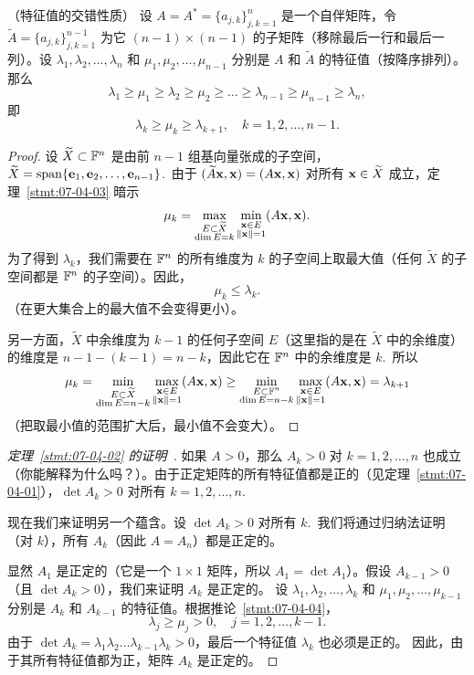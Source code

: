 \begin{corollary}\label{stmt:07-04-04}
（特征值的交错性质）
设 $A = A^* = \{a_{j,k}\}^{n}_{j,k=1}$ 是一个自伴矩阵，令 $\widetilde{A} = \{a_{j,k}\}^{n-1}_{j,k=1}$ 为它 $(n-1) \times (n-1)$ 的子矩阵（移除最后一行和最后一列）。设 $\lambda_1, \lambda_2, \dots, \lambda_n$ 和 $\mu_1, \mu_2, \dots, \mu_{n-1}$ 分别是 $A$ 和 $\widetilde{A}$ 的特征值（按降序排列）。那么
$$\lambda_1 \ge \mu_1 \ge \lambda_2 \ge \mu_2 \ge \dots \ge \lambda_{n-1} \ge \mu_{n-1} \ge \lambda_n,$$
即
$$\lambda_k \ge \mu_k \ge \lambda_{k+1},\quad k = 1, 2, \dots, n-1.$$
\end{corollary}

\begin{proof}
设 $\widetilde{X} \subset \mathbb{F}^n$ 是由前 $n-1$ 组基向量张成的子空间，$\widetilde{X} = \operatorname{span}\{\mathbf{e}_1, \mathbf{e}_2, \dots, \mathbf{e}_{n-1}\}$.~由于 $( \widetilde{A} \mathbf{x}, \mathbf{x} ) = ( A \mathbf{x}, \mathbf{x} )$ 对所有 $\mathbf{x} \in \widetilde{X}$ 成立，定理~\ref{stmt:07-04-03} 暗示
$$\mu_k = \max_{\substack{E \subset \widetilde{X}\\ \dim E = k}} \min_{\substack{\mathbf{x} \in E\\ \|\mathbf{x}\|=1}} (A\mathbf{x}, \mathbf{x}).$$
为了得到 $\lambda_k$，我们需要在 $\mathbb{F}^n$ 的所有维度为 $k$ 的子空间上取最大值（任何 $\widetilde{X}$ 的子空间都是 $\mathbb{F}^n$ 的子空间）。因此，$$\mu_k \le \lambda_k.$$ （在更大集合上的最大值不会变得更小）。

另一方面，$\widetilde{X}$ 中余维度为 $k-1$ 的任何子空间 $E$（这里指的是在 $\widetilde{X}$ 中的余维度）的维度是 $n-1 - (k-1) = n-k$，因此它在 $\mathbb{F}^n$ 中的余维度是 $k$.~所以
$$\mu_k = \min_{\substack{E \subset \widetilde{X}\\ \dim E = n-k}} \max_{\substack{\mathbf{x} \in E\\ \|\mathbf{x}\|=1}} (A\mathbf{x}, \mathbf{x}) \ge \min_{\substack{E \subset \mathbb{F}^n\\ \dim E = n-k}} \max_{\substack{\mathbf{x} \in E\\ \|\mathbf{x}\|=1}} (A\mathbf{x}, \mathbf{x}) = \lambda_{k+1}$$
（把取最小值的范围扩大后，最小值不会变大）。\end{proof}

\begin{proof}[\normalfont\heiti 定理~\ref{stmt:07-04-02} 的证明~\nopunct]
如果 $A > 0$，那么 $A_k > 0$ 对 $k=1, 2, \dots, n$ 也成立（你能解释为什么吗？）。由于正定矩阵的所有特征值都是正的（见定理~\ref{stmt:07-04-01}），$\det A_k > 0$ 对所有 $k=1, 2, \dots, n$.~

现在我们来证明另一个蕴含。设 $\det A_k > 0$ 对所有 $k$.~我们将通过归纳法证明（对 $k$），所有 $A_k$（因此 $A = A_n$）都是正定的。

显然 $A_1$ 是正定的（它是一个 $1 \times 1$ 矩阵，所以 $A_1 = \det A_1$）。假设 $A_{k-1} > 0$（且 $\det A_k > 0$），我们来证明 $A_k$ 是正定的。
设 $\lambda_1, \lambda_2, \dots, \lambda_k$ 和 $\mu_1, \mu_2, \dots, \mu_{k-1}$ 分别是 $A_k$ 和 $A_{k-1}$ 的特征值。根据推论~\ref{stmt:07-04-04}，
$$\lambda_j \ge \mu_j > 0,\quad j = 1, 2, \dots, k-1.$$
由于 $\det A_k = \lambda_1 \lambda_2 \dots \lambda_{k-1} \lambda_k > 0$，最后一个特征值 $\lambda_k$ 也必须是正的。
因此，由于其所有特征值都为正，矩阵 $A_k$ 是正定的。\end{proof}

